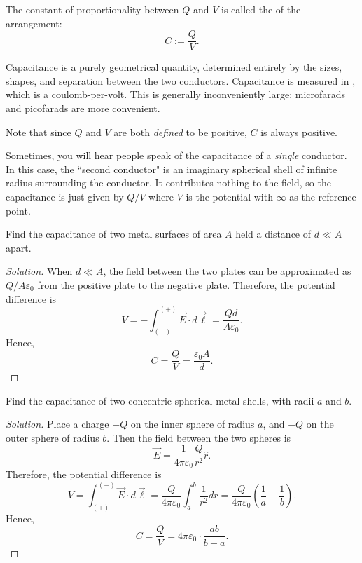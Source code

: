 \begin{definition}
The constant of proportionality between $Q$ and $V$ is called the  of the arrangement:
\[C:=\frac{Q}{V}.\]
\end{definition}

Capacitance is a purely geometrical quantity, determined entirely by the sizes, shapes, and separation between the two conductors. Capacitance is measured in , which is a coulomb-per-volt. This is generally inconveniently large: microfarads and picofarads are more convenient.

Note that since $Q$ and $V$ are both \textit{defined} to be positive, $C$ is always positive. 

\begin{remark}
Sometimes, you will hear people speak of the capacitance of a \textit{single} conductor. In this case, the ``second conductor" is an imaginary spherical shell of infinite radius surrounding the conductor. It contributes nothing to the field, so the capacitance is just given by $Q/V$ where $V$ is the potential with $\infty$ as the reference point.
\end{remark}

\begin{example}
Find the capacitance of two metal surfaces of area $A$ held a distance of $d\ll A$ apart.
\end{example}

\begin{proof}[Solution]
When $d\ll A$, the field between the two plates can be approximated as $Q/A\varepsilon_0$ from the positive plate to the negative plate. Therefore, the potential difference is
\[V=-\int_{(-)}^{(+)}\vec{E}\cdot d\vec{\ell}=\frac{Qd}{A\varepsilon_0}.\]
Hence,
\[C=\frac{Q}{V}=\boxed{\frac{\varepsilon_0A}{d}}.\]
\end{proof}

\begin{example}
Find the capacitance of two concentric spherical metal shells, with radii $a$ and $b$.
\end{example}

\begin{proof}[Solution]
Place a charge $+Q$ on the inner sphere of radius $a$, and $-Q$ on the outer sphere of radius $b$. Then the field between the two spheres is
\[\vec{E}=\frac{1}{4\pi\varepsilon_0}\frac{Q}{r^2}\hat{r}.\]
Therefore, the potential difference is
\[V=\int_{(+)}^{(-)}\vec{E}\cdot d\vec{\ell}=\frac{Q}{4\pi\varepsilon_0}\int_a^b\frac{1}{r^2}dr=\frac{Q}{4\pi\varepsilon_0}\left(\frac{1}{a}-\frac{1}{b}\right).\]
Hence,
\[C=\frac{Q}{V}=\boxed{4\pi\varepsilon_0\cdot\frac{ab}{b-a}}.\]
\end{proof}

